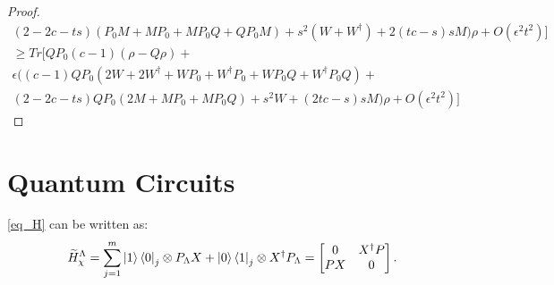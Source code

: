 \documentclass[10pt]{amsart}
\newcommand{\X}{\chi}
\begin{document}
\begin{proof}
\begin{multline}
        (2 - 2c - ts)(P_0 M + M P_0 + M P_0 Q + Q P_0 M) + s^2 (W + W^{\dagger}) + 2(tc - s)s M) \rho + O(\epsilon^2t^2) ]
    \end{multline}
    \begin{multline}
        \geq Tr[QP_0(c-1)(  \rho - Q\rho) +\\
        \epsilon( (c-1)QP_0( 2W +  2W^{\dagger} + W P_0 + W^{\dagger} P_0 + WP_0 Q + W^{\dagger}P_0 Q) +\\ (2 - 2c - ts)QP_0( 2M + M P_0 + M P_0 Q) + s^2 W + (2tc - s)s M) \rho + O(\epsilon^2t^2) ]
    \end{multline}

\end{proof}

\section{Quantum Circuits}


\eqref{eq_H} can be written as:
    \begin{equation}
        \widetilde{H}^{\Lambda}_{\X} =  \sum_{j=1}^m \ket{1}\bra{0}_j \otimes P_{\Lambda}X + \ket{0}\bra{1}_j \otimes X^{\dagger} P_{\Lambda} = \begin{bmatrix}
            0 & X^{\dagger}P \\ PX & 0 
        \end{bmatrix} .
    \end{equation}
\end{document}
